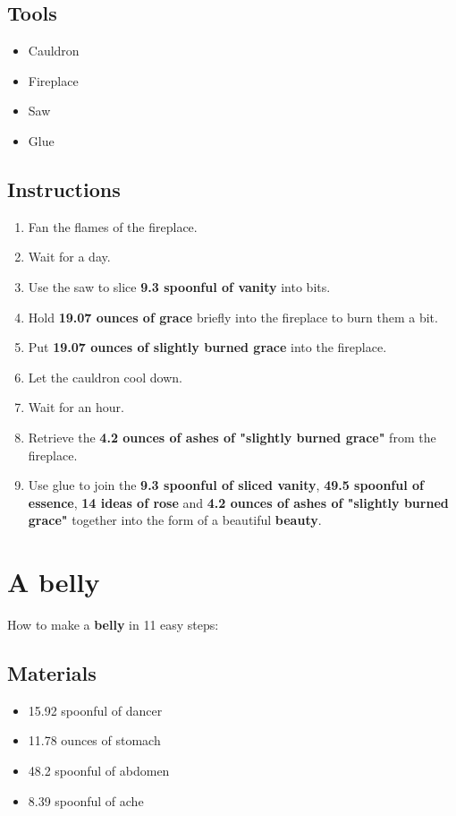\documentclass{article}
\begin{document}
\subsection{Tools}\begin{itemize}
\item 
Cauldron
\item 
Fireplace
\item 
Saw
\item 
Glue
\end{itemize}
\subsection{Instructions}\begin{enumerate}
\item 
Fan the flames of the fireplace.
\item 
Wait for a day.
\item 
Use the saw to slice \textbf{9.3 spoonful of vanity} into bits.
\item 
Hold \textbf{19.07 ounces of grace} briefly into the fireplace to burn them a bit.
\item 
Put \textbf{19.07 ounces of slightly burned grace} into the fireplace.
\item 
Let the cauldron cool down.
\item 
Wait for an hour.
\item 
Retrieve the \textbf{4.2 ounces of ashes of "slightly burned grace"} from the fireplace.
\item 
Use glue to join the \textbf{9.3 spoonful of sliced vanity}, \textbf{49.5 spoonful of essence}, \textbf{14 ideas of rose} and \textbf{4.2 ounces of ashes of "slightly burned grace"} together into the form of a beautiful \textbf{beauty}.
\end{enumerate}
\newpage
\section{A belly}How to make a \textbf{belly} in 11 easy steps:

\subsection{Materials}\begin{itemize}
\item 
15.92 spoonful of dancer
\item 
11.78 ounces of stomach
\item 
48.2 spoonful of abdomen
\item 
8.39 spoonful of ache
\end{itemize}
\end{document}
